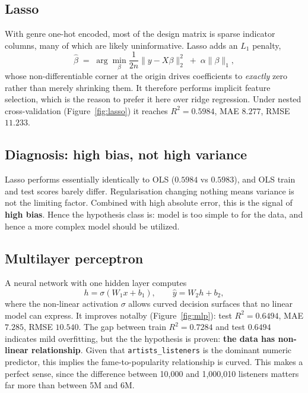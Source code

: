 \documentclass[10pt,twocolumn]{article}
\begin{document}
\subsection{Lasso}

With genre one-hot encoded, most of the design matrix is sparse indicator
columns, many of which are likely uninformative. Lasso adds an $L_1$ penalty,
\begin{equation}
\hat{\beta} \;=\; \arg\min_{\beta} \frac{1}{2n}\lVert y - X\beta \rVert_2^2
\;+\; \alpha \lVert \beta \rVert_1 ,
\end{equation}
whose non-differentiable corner at the origin drives coefficients to \emph{exactly}
zero rather than merely shrinking them. It therefore performs implicit feature
selection, which is the reason to prefer it here over ridge regression. Under
nested cross-validation (Figure~\ref{fig:lasso}) it reaches $R^2 = 0.5984$,
MAE $8.277$, RMSE $11.233$.

\subsection{Diagnosis: high bias, not high variance}

Lasso performs essentially identically to OLS ($0.5984$ vs $0.5983$), and OLS
train and test scores barely differ. Regularisation changing nothing means
variance is not the limiting factor. Combined with high absolute error, this is
the signal of \textbf{high bias}. Hence the hypothesis class is: model is too simple to for the data, and hence a more complex model should be utilized.

\subsection{Multilayer perceptron}

A neural network with one hidden layer computes
\begin{equation}
h = \sigma(W_1 x + b_1), \qquad \hat{y} = W_2 h + b_2 ,
\end{equation}
where the non-linear activation $\sigma$ allows curved decision surfaces that no
linear model can express. It improves notalby (Figure~\ref{fig:mlp}): test
$R^2 = 0.6494$, MAE $7.285$, RMSE $10.540$. The gap between train $R^2 = 0.7284$
and test $0.6494$ indicates mild overfitting, but the the hypothesis is proven:
\textbf{the data has non-linear relationship}. Given that \texttt{artists\_listeners} is the
dominant numeric predictor, this implies the fame-to-popularity relationship is
curved. This makes a perfect sense, since the difference between
10{,}000 and 1{,}000{,}010 listeners matters far more than between 5M and 6M.
\end{document}
